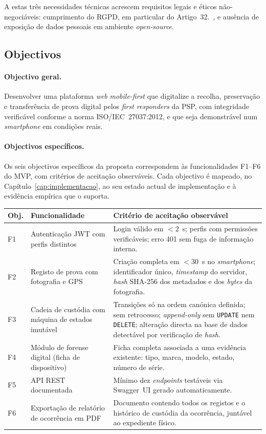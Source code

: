 A estas três necessidades técnicas acrescem requisitos legais e éticos
não-negociáveis: cumprimento do RGPD, em particular do
Artigo~32.\textordfeminine{}~\citep{rgpd2016}, e ausência de exposição
de dados pessoais em ambiente \emph{open-source}.

\subsection{Objectivos}
\label{sec:objectivos}

\paragraph{Objectivo geral.}
Desenvolver uma plataforma \emph{web} \emph{mobile-first} que
digitalize a recolha, preservação e transferência de prova digital
pelos \emph{first responders} da PSP, com integridade verificável
conforme a norma ISO/IEC~27037:2012, e que seja demonstrável num
\emph{smartphone} em condições reais.

\paragraph{Objectivos específicos.}
Os seis objectivos específicos da proposta correspondem às
funcionalidades F1--F6 do MVP, com critérios de aceitação observáveis.
Cada objectivo é mapeado, no Capítulo~\ref{cap:implementacao}, ao seu
estado actual de implementação e à evidência empírica que o suporta.

\begin{longtable}{@{}L{1.0cm}L{6.0cm}L{7.5cm}@{}}
\toprule
\textbf{Obj.} & \textbf{Funcionalidade} & \textbf{Critério de aceitação observável} \\
\midrule
\endhead
F1 & Autenticação JWT com perfis distintos & Login válido em \(<\)2~s; perfis com permissões verificáveis; erro 401 sem fuga de informação interna. \\
\midrule
F2 & Registo de prova com fotografia e GPS & Criação completa em \(<\)30~s no \emph{smartphone}; identificador único, \emph{timestamp} do servidor, \emph{hash} SHA-256 dos metadados e dos \emph{bytes} da fotografia. \\
\midrule
F3 & Cadeia de custódia com máquina de estados imutável & Transições só na ordem canónica definida; sem retrocesso; \emph{append-only} sem \texttt{UPDATE} nem \texttt{DELETE}; alteração directa na base de dados detectável por verificação de \emph{hash}. \\
\midrule
F4 & Módulo de forense digital (ficha de dispositivo) & Ficha completa associada a uma evidência existente: tipo, marca, modelo, estado, número de série. \\
\midrule
F5 & API REST documentada & Mínimo dez \emph{endpoints} testáveis via Swagger~UI gerado automaticamente. \\
\midrule
F6 & Exportação de relatório de ocorrência em PDF & Documento contendo todos os registos e o histórico de custódia da ocorrência, juntável ao expediente físico. \\
\bottomrule
\end{longtable}

